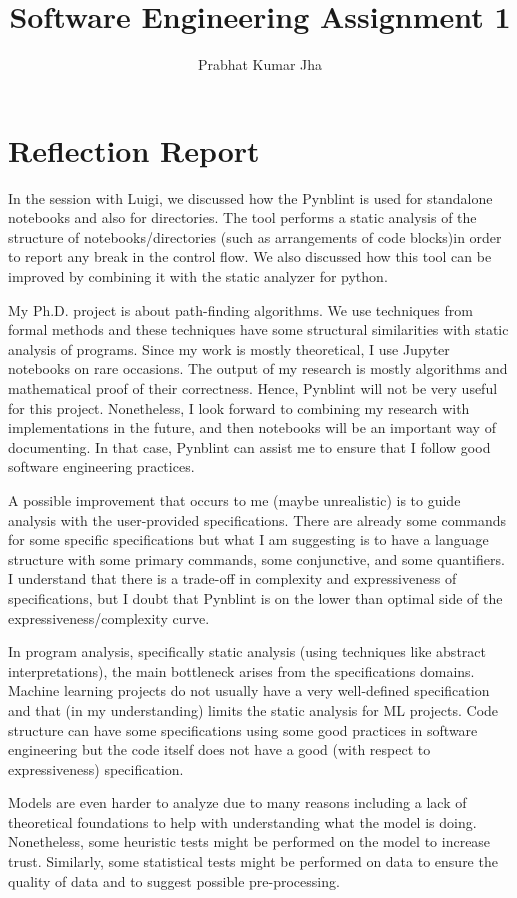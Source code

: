 \documentclass[11pt]{article}
\title{Software Engineering Assignment 1}
\author{Prabhat Kumar Jha}
\begin{document}
\maketitle


\section*{Reflection Report}
In the session with Luigi, we discussed how the Pynblint is used for standalone notebooks and also for directories. The tool performs a static analysis of the structure of notebooks/directories (such as arrangements of code blocks)in order to report any break in the control flow.  We also discussed how this tool can be improved by combining it with the static analyzer for python. 

My Ph.D. project is about path-finding algorithms. We use techniques from formal methods and these techniques have some structural similarities with static analysis of programs. Since my work is mostly theoretical, I use Jupyter notebooks on rare occasions. The output of my research is mostly algorithms and mathematical proof of their correctness. Hence, Pynblint will not be very useful for this project. Nonetheless, I look forward to combining my research with implementations in the future, and then notebooks will be an important way of documenting. In that case, Pynblint can assist me to ensure that I follow good software engineering practices.

A possible improvement that occurs to me (maybe unrealistic) is to guide analysis with the user-provided specifications. There are already some commands for some specific specifications but what I am suggesting is to have a language structure with some primary commands, some conjunctive, and some quantifiers. I understand that there is a trade-off in complexity and expressiveness of specifications, but I doubt that Pynblint is on the lower than optimal side of the expressiveness/complexity curve. 

In program analysis, specifically static analysis (using techniques like abstract interpretations), the main bottleneck arises from the specifications domains. Machine learning projects do not usually have a very well-defined specification and that (in my understanding) limits the static analysis for ML projects. Code structure can have some specifications using some good practices in software engineering but the code itself does not have a good (with respect to expressiveness) specification. 

Models are even harder to analyze due to many reasons including a lack of theoretical foundations to help with understanding what the model is doing. Nonetheless, some heuristic tests might be performed on the model to increase trust. Similarly, some statistical tests might be performed on data to ensure the quality of data and to suggest possible pre-processing. 
\end{document}

